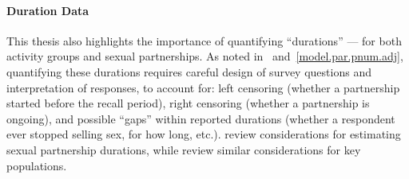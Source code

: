 \paragraph{Duration Data}
This thesis also highlights the importance of quantifying ``durations''
--- for both activity groups and sexual partnerships.
As noted in ~and~\ref{model.par.pnum.adj},
quantifying these durations requires
careful design of survey questions and interpretation of responses, to account for:
left censoring (\eg whether a partnership started before the recall period),
right censoring (\eg whether a partnership is ongoing), and
possible ``gaps'' within reported durations
(\eg whether a respondent ever stopped selling sex, for how long, etc.).
\citet{Burington2010} review considerations for estimating sexual partnership durations, while
\citet{Fazito2012} review similar considerations for key populations.

